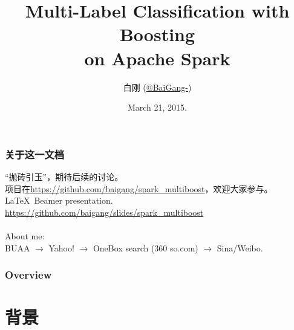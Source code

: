 \documentclass{beamer}
\title[MultiBoost]{Multi-Label Classification with Boosting \\ on Apache Spark}
\author{
白刚  (\href{http://weibo.com/baigang111}{@BaiGang-})
} %
\institute[Sina] %
{
\textit{Sina Ad-Algo}
}
\date{March 21, 2015.} %
\begin{document}
\begin{frame}
\titlepage %
\end{frame}

\begin{frame}
\frametitle{关于这一文档}
“抛砖引玉”，期待后续的讨论。 \\ 
项目在\url{https://github.com/baigang/spark_multiboost}，欢迎大家参与。 \ \\

\LaTeX\  Beamer presentation.  \\
\url{https://github.com/baigang/slides/spark_multiboost} \\ \ \\

About me: \\
BUAA $\rightarrow$ Yahoo! $\rightarrow$ OneBox search (360 so.com) $\rightarrow$ Sina/Weibo.

\end{frame}

\begin{frame}
\frametitle{Overview} %
\tableofcontents %
\end{frame}



\section{背景}
\end{document}
